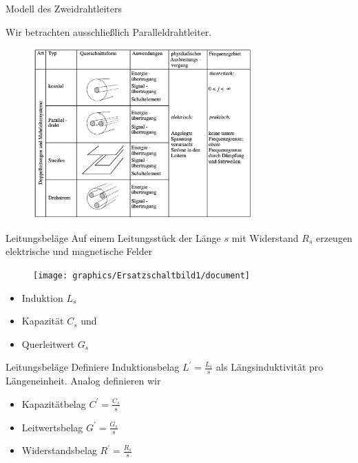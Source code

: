 \documentclass{beamer}
\begin{document}
\begin{frame}{Modell des Zweidrahtleiters}

Wir betrachten ausschließlich Paralleldrahtleiter.

\begin{figure}[!htb]
    \begin{center}
        \includegraphics[width=0.75\textwidth]{../Ausarbeitung/images/Leiter.png}
    \end{center}
\end{figure}

\end{frame}


\begin{frame}{Leitungsbeläge}
Auf einem Leitungsstück der Länge $s$ mit Widerstand $R_{s}$ erzeugen elektrische und magnetische Felder
\begin{figure}[!htb]
    \begin{center}
        \texttt{[image: graphics/Ersatzschaltbild1/document]}
    \end{center}
\end{figure}
\begin{itemize}
    \item Induktion $L_{s}$
    \item Kapazität $C_{s}$ und
    \item Querleitwert $G_{s}$
\end{itemize}

\end{frame}


\begin{frame}{Leitungsbeläge}
Definiere Induktionsbelag $L^{\prime} = \frac{L_{s}}{s}$ als Längsinduktivität pro Längeneinheit.
Analog definieren wir
\begin{itemize}
    \item Kapazitätbelag $C^{\prime} = \frac{C_{s}}{s}$
    \item Leitwertsbelag $G^{\prime} = \frac{G_{s}}{s}$
    \item Widerstandsbelag $R^{\prime} = \frac{R_{s}}{s}$
\end{itemize}

\end{frame}
\end{document}
